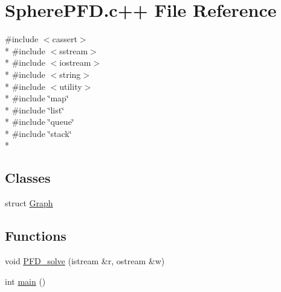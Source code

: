 \hypertarget{SpherePFD_8c_09_09}{\section{Sphere\-P\-F\-D.\-c++ File Reference}
\label{SpherePFD_8c_09_09}
}
{\ttfamily \#include $<$cassert$>$}\\*
{\ttfamily \#include $<$sstream$>$}\\*
{\ttfamily \#include $<$iostream$>$}\\*
{\ttfamily \#include $<$string$>$}\\*
{\ttfamily \#include $<$utility$>$}\\*
{\ttfamily \#include \char`\"{}map\char`\"{}}\\*
{\ttfamily \#include \char`\"{}list\char`\"{}}\\*
{\ttfamily \#include \char`\"{}queue\char`\"{}}\\*
{\ttfamily \#include \char`\"{}stack\char`\"{}}\\*
\subsection*{Classes}
\begin{DoxyCompactItemize}
\item 
struct \hyperlink{structGraph}{Graph}
\end{DoxyCompactItemize}
\subsection*{Functions}
\begin{DoxyCompactItemize}
\item 
void \hyperlink{SpherePFD_8c_09_09_ad1fb4f8285d98373eb99cc90453aa1df}{P\-F\-D\-\_\-solve} (istream \&r, ostream \&w)
\item 
int \hyperlink{SpherePFD_8c_09_09_ae66f6b31b5ad750f1fe042a706a4e3d4}{main} ()
\end{DoxyCompactItemize}


